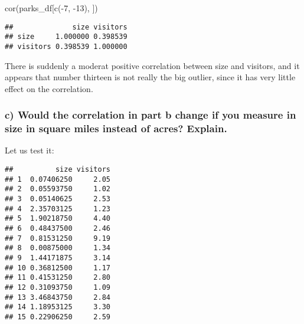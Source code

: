 \documentclass[
]{article}
\newenvironment{Shaded}{\begin{snugshade}}{\end{snugshade}}
\newcommand{\DecValTok}[1]{\textcolor[rgb]{0.00,0.00,0.81}{#1}}
\newcommand{\FunctionTok}[1]{\textcolor[rgb]{0.00,0.00,0.00}{#1}}
\newcommand{\NormalTok}[1]{#1}
\newcommand{\OtherTok}[1]{\textcolor[rgb]{0.56,0.35,0.01}{#1}}
\newcommand{\SpecialCharTok}[1]{\textcolor[rgb]{0.00,0.00,0.00}{#1}}
\begin{document}
\begin{Shaded}
\begin{Highlighting}[]
\FunctionTok{cor}\NormalTok{(parks\_df[}\FunctionTok{c}\NormalTok{(}\SpecialCharTok{{-}}\DecValTok{7}\NormalTok{, }\SpecialCharTok{{-}}\DecValTok{13}\NormalTok{), ])}
\end{Highlighting}
\end{Shaded}

\begin{verbatim}
##              size visitors
## size     1.000000 0.398539
## visitors 0.398539 1.000000
\end{verbatim}

There is suddenly a moderat positive correlation between size and
visitors, and it appears that number thirteen is not really the big
outlier, since it has very little effect on the correlation.

\hypertarget{c-would-the-correlation-in-part-b-change-if-you-measure-in-size-in-square-miles-instead-of-acres-explain.}{%
\subsubsection{c) Would the correlation in part b change if you measure
in size in square miles instead of acres?
Explain.}\label{c-would-the-correlation-in-part-b-change-if-you-measure-in-size-in-square-miles-instead-of-acres-explain.}}

Let us test it:

\begin{Shaded}
\end{Shaded}

\begin{verbatim}
##          size visitors
## 1  0.07406250     2.05
## 2  0.05593750     1.02
## 3  0.05140625     2.53
## 4  2.35703125     1.23
## 5  1.90218750     4.40
## 6  0.48437500     2.46
## 7  0.81531250     9.19
## 8  0.00875000     1.34
## 9  1.44171875     3.14
## 10 0.36812500     1.17
## 11 0.41531250     2.80
## 12 0.31093750     1.09
## 13 3.46843750     2.84
## 14 1.18953125     3.30
## 15 0.22906250     2.59
\end{verbatim}
\end{document}
